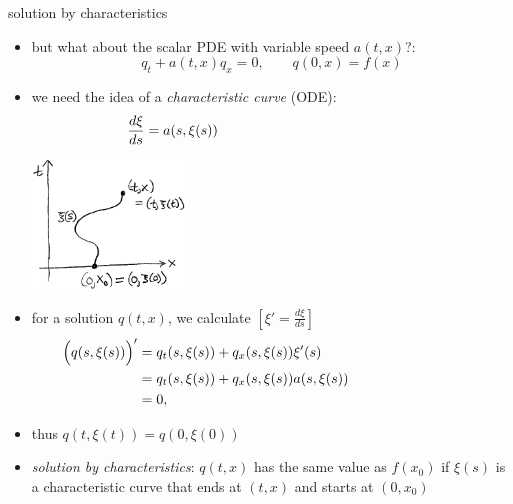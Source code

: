 \documentclass[10pt,hyperref,dvipsnames]{beamer}
\newcommand{\ds}{\displaystyle}
\begin{document}
\begin{frame}{solution by characteristics}

\begin{itemize}
\item but what about the scalar PDE with variable speed $a(t,x)$?:
    $$q_t + a(t,x) q_x=0, \qquad q(0,x) = f(x)$$
\item we need the idea of a \emph{characteristic curve} (ODE):
    $$\ds \frac{d\xi}{ds} = a(s,\xi(s)) \hspace{50mm}$$

\vspace{-10mm}

\hfill \includegraphics[width=0.32\textwidth]{figs/characteristicsketch}

\vspace{-20mm}
\item for a solution $q(t,x)$, we calculate $\left[\xi'=\tfrac{d\xi}{ds}\right]$
\begin{align*}
\Big(q(s,\xi(s))\Big)' &= q_t(s,\xi(s)) + q_x(s,\xi(s)) \xi'(s) \hspace{40mm} \\
                          &= q_t(s,\xi(s)) + q_x(s,\xi(s)) a(s,\xi(s)) \\
                          &= 0,
\end{align*}
\item thus $q(t,\xi(t)) = q(0,\xi(0))$
\item \emph{solution by characteristics}: $q(t,x)$ has the same value as $f(x_0)$ if $\xi(s)$ is a characteristic curve that ends at $(t,x)$ and starts at $(0,x_0)$
\end{itemize}
\end{frame}
\end{document}
